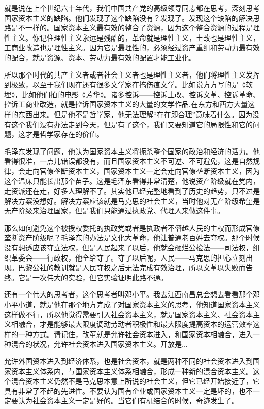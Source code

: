 \documentclass[UTF8, 12pt, a4paper]{ctexrep}
\begin{document}
就是说在上个世纪六十年代，我们中国共产党的高级领导同志都在思考，深刻思考国家资本主义的缺陷。他们发现了这个缺陷没有？发现了。发现这个缺陷的解决思路是不一样的。国家资本主义最有效的整合了资源，因为这个整合资源的过程是理性主义。你记住理性主义永远是残酷的，革命就是理性主义，土改也是理性主义，工商业改造也是理性主义。因为它是最理性的，必须经过资产重组和劳动力最有效的配合，就是资源、资本、劳动力最有效的配置才能工业化。

所以那个时代的共产主义者或者社会主义者也是理性主义者，他们将理性主义发挥到极致，以至于我们现在还有很多文学家在搞伤痕文学。比如说方方写的是《软埋》，比如他们拍的电影《芳华》。诸多控诉——控诉土改、控诉文革、控诉革命、控诉工商业改造，就是控诉国家资本主义的大量的文学作品,在东方和西方大量这样的东西出来。但是他不是哲学家，他无法理解“存在即合理”意味着什么。因为没有这个我们没有办法走到今天，但是有了这个，我们又要知道它的局限性和它的问题，这才是哲学家存在的价值。

毛泽东发现了问题，他认为国家资本主义将扼杀整个国家的政治和经济的活力。他看得很准，一点儿错误都没有，而且国家资本主义不可逆、不可避免，这是自然规律，会走向官僚垄断资本主义，国家资本主义一定会走向官僚垄断资本主义，因为这个温床只能长出那个苗子。这是毛泽东看得非常清楚，他说资产阶级就在党内，走资派还在走，好多人理解不了。其实他已经完整地看到了历史的趋势，只不过是解决方案没想好。解决方案应该就是马克思的社会主义，当时他对无产阶级希望是无产阶级来治理国家，但是我们只能通过执政党、代理人来做这件事。

那么如何避免这个被授权委托的执政党或者是执政者不僭越人民的主权而形成官僚垄断资产阶级呢？毛泽东的办法是文化大革命，他让普通老百姓去夺权。那个时候没有想透应该夺立法权，但是人民起来了以后，他就会砸烂公检法——司法权，组织革委会——行政权，他全给夺了。夺了以后呢，人民——马克思的担心立刻出现。巴黎公社的教训就是人民夺权之后无法完成有效治理，所以文革以失败而告终。它是一次伟大的实验，但它实验证明此路不通。

还有一个伟大的思考者，这个思考者叫邓小平。我去江西南昌总会想去看看那个邓小平小道，就是他在那个地方完成了对国家资本主义的思考，他知道国家资本主义这样做不行，所以他觉得需要引入社会资本主义，就是国家资本主义、社会资本主义相融合，才是能够最大限度调动劳动者积极性和最大限度提高资本的运营效率这样的一种方式。请记住，改革就是允许社会资本进入，和国家资本相融合，进入一种混合的状况，允许社会资本进入国家资本主义。开放是...

允许外国资本进入到经济体系，也是社会资本，就是两种不同的社会资本进入到国家资本主义体系内，与国家资本主义体系相融合，形成一种新的混合资本主义。这个混合资本主义仍然不是马克思本意上所说的社会主义，但它已经开始接近了，它具有非常了不起的先进性。不要认为国有企业或国家资本主义一定是坏的，也不一定要认为社会资本主义一定是好的。当它们有机结合的时候，奇迹发生了。
\end{document}
